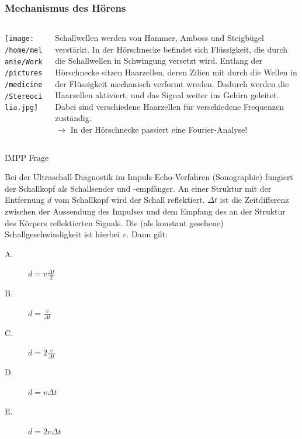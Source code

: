 \documentclass{beamer}
\begin{document}
\begin{frame}
 \frametitle{Mechanismus des Hörens}

\begin{columns}[c]


\begin{column}{4cm}
\begin{center}
\texttt{[image: /home/melanie/Work/pictures/medicine/Stereocilia.jpg]}
\end{center}
\end{column}

\pause

\begin{column}{7cm}
Schallwellen werden von Hammer, Amboss und Steigbügel verstärkt. In der Hörschnecke befindet sich Flüssigkeit, die durch die Schallwellen in Schwingung versetzt wird. Entlang der Hörschnecke sitzen Haarzellen, deren Zilien mit durch die Wellen in der Flüssigkeit mechanisch verformt wreden. Dadurch werden die Haarzellen aktiviert, und das Signal weiter ins Gehirn geleitet. Dabei sind verschiedene Haarzellen für verschiedene Frequenzen zuständig.   \\
\pause
\textcolor{theme}{\(\rightarrow\) In der Hörschnecke passiert eine Fourier-Analyse!}
\end{column}

\end{columns}

\end{frame}


\begin{frame}{IMPP Frage}

Bei der Ultraschall-Diagnostik im Impuls-Echo-Verfahren (Sonographie) fungiert der Schallkopf als Schallsender und -empfänger. An einer Struktur mit der Entfernung \(d\) vom Schallkopf wird der Schall reflektiert. \(\Delta t\) ist die Zeitdifferenz zwischen der Aussendung des Impulses und dem Empfang des an der Struktur des Körpers reflektierten Signals. Die (als konstant gesehene) Schallgeschwindigkeit ist hierbei \(v\). Dann gilt:\\[0.2 cm]

\begin{description}
\item[A.]
\(d=v \frac{\Delta t}{2} \) \\[0.3 cm]
\item[B.]
\(d= \frac{v}{\Delta t}\) \\[0.3 cm]
\item[C.]
\(d= 2\frac{v}{\Delta t}\) \\[0.3 cm]
\item[D.]
\(d= v\Delta t\) \\[0.3 cm]
\item[E.]
\(d= 2v\Delta t\)
\end{description}


\end{frame}
\end{document}
